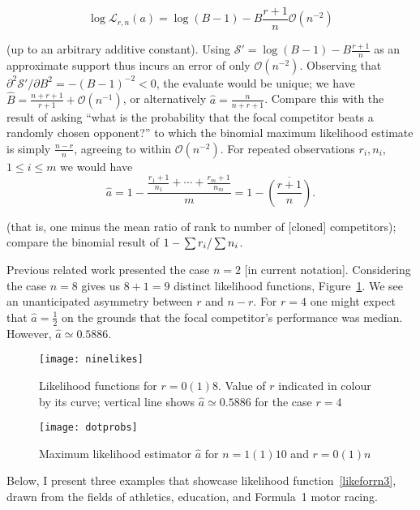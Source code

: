 \documentclass[sts]{imsart}
\begin{document}
\begin{equation}\label{asymptotic}
\log\mathcal{L}_{r,n}(a)=\log(B-1)-B\frac{r+1}{n}
\mathcal{O}\left(n^{-2}\right)
\end{equation}

(up to an arbitrary additive constant).  Using
$\mathcal{S}'=\log(B-1)-B\frac{r+1}{n}$ as an approximate support thus
incurs an error of only $\mathcal{O}(n^{-2})$.  Observing that
$\partial^2\mathcal{S'}/\partial B^2=-(B-1)^{-2}<0$, the evaluate
would be unique; we have
$\hat{B}=\frac{n+r+1}{r+1}+\mathcal{O}\left(n^{-1}\right)$, or
alternatively $\hat{a}=\frac{n}{n+r+1}$.  Compare this with the result
of asking ``what is the probability that the focal competitor
beats a randomly chosen opponent?'' to which the binomial maximum
likelihood estimate is simply $\frac{n-r}{n}$, agreeing to within
$\mathcal{O}(n^{-2})$.  For repeated observations $r_i,n_i$,
$1\leqslant i\leqslant m$ we would have
\begin{equation}
  \hat{a} = 1-
  \frac{\frac{r_1+1}{n_1}+\cdots+\frac{r_m+1}{n_m}}{m}
  = 1-\overline{\left(\frac{r+1}{n}\right)}.
\end{equation}

(that is, one minus the mean ratio of rank to number of [cloned]
competitors); compare the binomial result of $1-\left.\sum
r_i\right/\sum n_i$.

Previous related work presented the case $n=2$ [in current notation].
Considering the case $n=8$ gives us $8+1=9$ distinct likelihood
functions, Figure~\ref{ninelikes}.  We see an unanticipated asymmetry
between $r$ and $n-r$.  For $r=4$ one might expect that
$\hat{a}=\frac{1}{2}$ on the grounds that the focal competitor's
performance was median.  However, $\hat{a}\simeq 0.5886$.

\begin{figure}[t]
\texttt{[image: ninelikes]}  %
\caption{Likelihood functions for $r=0(1)8$\label{ninelikes}.  Value of $r$ indicated in colour by its curve; vertical line shows $\hat{a}\simeq 0.5886$ for the case $r=4$}
\end{figure}


\begin{figure}[t]
\texttt{[image: dotprobs]}  %
\caption{Maximum likelihood estimator $\hat{a}$ for $n=1(1)10$ and $r=0(1)n$
  \label{dotprobs}}
\end{figure}


Below, I present three examples that showcase likelihood
function~\ref{likeforrn3}, drawn from the fields of athletics,
education, and Formula~1 motor racing.
\end{document}
